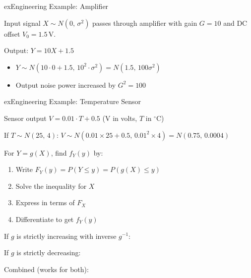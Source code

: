 \begin{PSbox}[unbreakable]{ex}{Engineering Example: Amplifier}

Input signal $X \sim N(0,\, \sigma^{2})$ passes through amplifier with gain $G = 10$ and DC offset $V_{0} = 1.5\,\mathrm{V}$.

Output: $Y = 10X + 1.5$

\begin{itemize}
\tightlist
\item
  $Y \sim N(10 \cdot 0 + 1.5,\, 10^{2} \cdot \sigma^{2}) = N(1.5,\, 100\sigma^{2})$
\item
  Output noise power increased by $G^{2} = 100$
\end{itemize}

\end{PSbox}

\begin{PSbox}[unbreakable]{ex}{Engineering Example: Temperature Sensor}

Sensor output $V = 0.01 \cdot T + 0.5$ (V in volts, $T$ in \ensuremath{^{\circ}}C)

If $T \sim N(25,\, 4)$: $V \sim N(0.01 \times 25 + 0.5,\, 0.01^{2} \times 4) = N(0.75,\, 0.0004)$

\end{PSbox}



For $Y = g(X)$, find $f_{Y}(y)$ by:

\begin{enumerate}
\def\labelenumi{\arabic{enumi}.}
\tightlist
\item
  Write $F_{Y}(y) = P(Y \le y) = P(g(X) \le y)$
\item
  Solve the inequality for $X$
\item
  Express in terms of $F_{X}$
\item
  Differentiate to get $f_{Y}(y)$
\end{enumerate}


If $g$ is strictly increasing with inverse $g^{-1}$:

If $g$ is strictly decreasing:

Combined (works for both):

